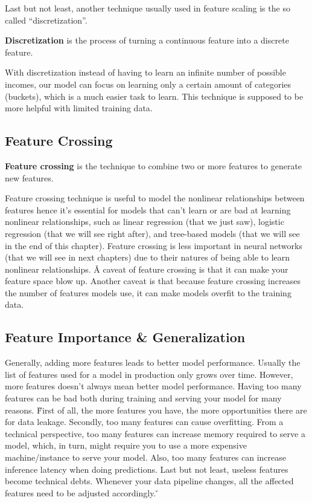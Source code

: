 Last but not least, another technique usually used in feature scaling is the so called ``discretization''.

\bd[Discretization]
\textbf{Discretization} is the process of turning a continuous feature into a discrete feature.
\ed


With discretization instead of having to learn an infinite number of possible incomes, our model can focus on
learning only a certain amount of categories (buckets), which is a much easier task to learn. This technique is
supposed to be more helpful with limited training data.

\subsection{Feature Crossing}

\textbf{Feature crossing} is the technique to combine two or more features to generate new features.
\ed

Feature crossing technique is useful to model the nonlinear relationships between features hence it's essential for
models that can't learn or are bad at learning nonlinear relationships, such as linear regression (that we just saw),
logistic regression (that we will see right after), and tree-based models (that we will see in the end of this chapter).
Feature crossing is less important in neural networks (that we will see in next chapters) due to their natures of being
able to learn nonlinear relationships. \v

A caveat of feature crossing is that it can make your feature space blow up. Another caveat is that because feature
crossing increases the number of features models use, it can make models overfit to the training data.

\subsection{Feature Importance \& Generalization}

Generally, adding more features leads to better model performance. Usually the list of features used for a model in
production only grows over time. However, more features doesn't always mean better model performance. Having too many
features can be bad both during training and serving your model for many reasons. \v

First of all, the more features you have, the more opportunities there are for data leakage. Secondly, too many
features can cause overfitting. From a technical perspective, too many features can increase memory required to serve
a model, which, in turn, might require you to use a more expensive machine/instance to serve your model. Also, too
many features can increase inference latency when doing predictions. Last but not least, useless features become
technical debts. Whenever your data pipeline changes, all the affected features need to be adjusted accordingly. \v

